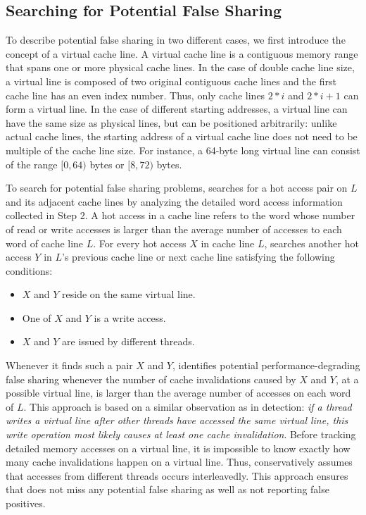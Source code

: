\subsection{Searching for Potential False Sharing}
\label{sec:evaluatingfs}
To describe potential false sharing in two different cases, we first 
introduce the concept of a virtual cache line.  A virtual cache line
is a contiguous memory range that spans one or more physical cache 
lines.  In the case of double cache line size, a virtual line is
composed of two original contiguous cache lines and the first cache
line has an even index number.  Thus, only cache lines $2*i$ and
$2*i+1$ can form a virtual line.  In the case of different starting
addresses, a virtual line can have the same size as physical lines,
but can be positioned arbitrarily: unlike actual cache lines, the
starting address of a virtual cache line does not need to be multiple
of the cache line size.  For instance, a 64-byte long virtual line can
consist of the range $[0,64)$ bytes or $[8,72)$ bytes.

To search for potential false sharing problems, 
\Predator{} searches for a hot access pair on $L$ and its adjacent cache lines 
by analyzing the detailed word access information collected in Step 2. 
A hot access in a cache line refers to the word whose number of read or write accesses 
is larger than the average number of accesses to each word of cache line $L$.
For every hot access $X$ in cache line $L$, \Predator{} searches another
hot access $Y$ in $L$'s previous cache line or next cache line satisfying
the following conditions: 

\begin{itemize}
\item
$X$ and $Y$ reside on the same virtual line. 

\item
One of $X$ and $Y$ is a write access.

\item 
$X$ and $Y$ are issued by different threads.

\end{itemize}

Whenever it finds such a pair $X$ and $Y$, 
\Predator{} identifies potential performance-degrading false sharing whenever
 the number of cache invalidations caused by $X$ and $Y$, at a possible virtual line, 
is larger than the average number of accesses on each word of $L$. 
This approach is based on a similar observation as in detection:
\emph{if a thread writes a virtual line after other threads 
have accessed the same virtual line, this write operation most likely causes at least one cache 
invalidation}. 
Before tracking detailed memory accesses on a virtual line, it is impossible to know exactly how many cache invalidations happen on a virtual line. Thus, \Predator{} conservatively assumes that accesses from different threads occurs interleavedly.
This approach ensures that \Predator{} does not miss any potential false sharing as well as 
not reporting false positives. 


